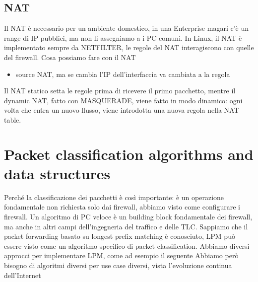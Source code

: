 \documentclass[12pt, oneside]{extbook} %
\begin{document}
\subsection{NAT}
Il NAT è necessario per un ambiente domestico, in una Enterprise magari c'è un range di IP pubblici, ma non li assegniamo a i PC comuni. In Linux, il NAT è implementato sempre da NETFILTER, le regole del NAT interagiscono con quelle del firewall. Cosa possiamo fare con il NAT
\begin{itemize}
\item source NAT, ma se cambia l'IP dell'interfaccia va cambiata a la regola
\end{itemize}
Il NAT statico setta le regole prima di ricevere il primo pacchetto, mentre il dynamic NAT, fatto con MASQUERADE, viene fatto in modo dinamico: ogni volta che entra un nuovo flusso, viene introdotta una nuova regola nella NAT table.
\section{Packet classification algorithms and data structures}
Perché la classificazione dei pacchetti è così importante: è un operazione fondamentale non richiesta solo dai firewall, abbiamo visto come configurare i firewall. Un algoritmo di PC veloce è un building block fondamentale dei firewall, ma anche in altri campi dell'ingegneria del traffico e delle TLC. Sappiamo che il packet forwarding basato su longest prefix matching è conosciuto, LPM può essere visto come un algoritmo specifico di packet classification. Abbiamo diversi approcci per implementare LPM, come ad esempio il seguente
Abbiamo però bisogno di algoritmi diversi per use case diversi, vista l'evoluzione continua dell'Internet
\end{document}
